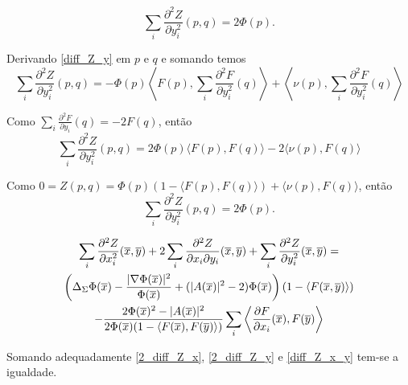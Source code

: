 \begin{proposicao}
	\begin{equation}\label{2_diff_Z_y}
	\sum_i \frac{\partial^2 Z}{\partial y_i^2}(p,q) = 2 \Phi(p).
	\end{equation}
\end{proposicao}

\begin{demonstracao}
	Derivando \ref{diff_Z_y} em $p$ e $q$ e somando  temos
	\begin{equation*}
		\sum_i \frac{\partial^2 Z}{\partial y_i^2}(p,q) = - \Phi(p) \left\langle F(p), \sum_i \frac{\partial^2 F}{\partial y_i^2}(q) \right\rangle + \left\langle \nu(p), \sum_i \frac{\partial^2 F}{\partial y_i^2}(q) \right\rangle
	\end{equation*}
	
	Como $\sum_i \frac{\partial^2 F}{\partial y_i}(q) = -2 F(q)$, então
	\begin{equation*}
		\sum_i \frac{\partial^2 Z}{\partial y_i^2}(p,q) = 2 \Phi(p) \langle F(p), F(q) \rangle - 2 \langle \nu(p), F(q) \rangle
	\end{equation*}
	
	Como $0 = Z(p,q) = \Phi(p)(1 - \langle F(p), F(q) \rangle) + \langle \nu(p), F(q) \rangle$, então
	\begin{equation*}
		\sum_i \frac{\partial^2 Z}{\partial y_i^2}(p,q) = 2 \Phi(p).
	\end{equation*}
\end{demonstracao}


\begin{proposicao}
	\begin{multline}\label{suma_2das_derivadas}
		\sum_i \frac{\partial^2 Z}{\partial x_i^2}(\overline{x},\overline{y}) + 2 \sum_i \frac{\partial^2 Z}{\partial x_i \partial y_i}(\overline{x},\overline{y}) + \sum_i \frac{\partial^2 Z}{\partial y_i^2}(\overline{x},\overline{y}) =\\
		\left( \Delta_{\Sigma} \Phi(\overline{x}) - \frac{| \nabla \Phi(\overline{x}) |^2}{\Phi(\overline{x})} + ( | A(\overline{x}) |^2 - 2 ) \Phi(\overline{x}) \right) (1 - \langle F(\overline{x},\overline{y}) \rangle)\\
		- \frac{2 \Phi(\overline{x})^2- |A(\overline{x})|^2}{2 \Phi(\overline{x})(1 - \langle F(\overline{x}),F(\overline{y}) \rangle)} \sum_i \left\langle \frac{\partial F}{\partial x_i}(\overline{x}), F(\overline{y}) \right\rangle
	\end{multline}
\end{proposicao}

\begin{demonstracao}
	Somando adequadamente \eqref{2_diff_Z_x}, \eqref{2_diff_Z_y} e \eqref{diff_Z_x_y} tem-se a igualdade.
\end{demonstracao}

